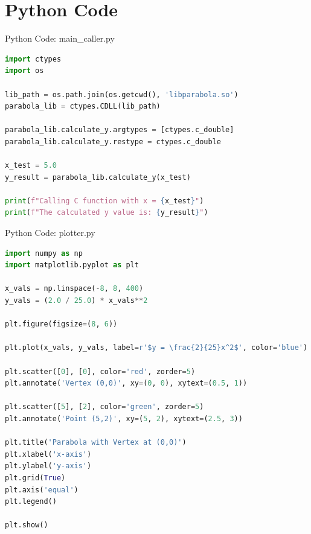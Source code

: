 \documentclass{beamer}
\numberwithin{equation}{section}
\theoremstyle{remark}
\begin{document}
\section{Python Code}
\begin{frame}[fragile]{Python Code: main\_caller.py}
\begin{lstlisting}[language=Python]
import ctypes
import os

lib_path = os.path.join(os.getcwd(), 'libparabola.so')
parabola_lib = ctypes.CDLL(lib_path)

parabola_lib.calculate_y.argtypes = [ctypes.c_double]
parabola_lib.calculate_y.restype = ctypes.c_double

x_test = 5.0
y_result = parabola_lib.calculate_y(x_test)

print(f"Calling C function with x = {x_test}")
print(f"The calculated y value is: {y_result}")
\end{lstlisting}
\end{frame}

\begin{frame}[fragile]{Python Code: plotter.py}
\begin{lstlisting}[language=Python]
import numpy as np
import matplotlib.pyplot as plt

x_vals = np.linspace(-8, 8, 400)
y_vals = (2.0 / 25.0) * x_vals**2

plt.figure(figsize=(8, 6))

plt.plot(x_vals, y_vals, label=r'$y = \frac{2}{25}x^2$', color='blue')

plt.scatter([0], [0], color='red', zorder=5)
plt.annotate('Vertex (0,0)', xy=(0, 0), xytext=(0.5, 1))

plt.scatter([5], [2], color='green', zorder=5)
plt.annotate('Point (5,2)', xy=(5, 2), xytext=(2.5, 3))

plt.title('Parabola with Vertex at (0,0)')
plt.xlabel('x-axis')
plt.ylabel('y-axis')
plt.grid(True)
plt.axis('equal')
plt.legend()

plt.show()
\end{lstlisting}
\end{frame}
\end{document}
